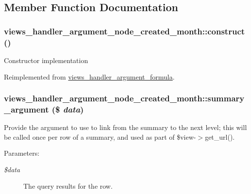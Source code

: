 \subsection{Member Function Documentation}
\hypertarget{classviews__handler__argument__node__created__month_0f9b4da1f37a58ca3e416667dc8d9bbb}{
\subsubsection[{construct}]{\setlength{\rightskip}{0pt plus 5cm}views\_\-handler\_\-argument\_\-node\_\-created\_\-month::construct ()}}
\label{classviews__handler__argument__node__created__month_0f9b4da1f37a58ca3e416667dc8d9bbb}


Constructor implementation 

Reimplemented from \hyperlink{classviews__handler__argument__formula_01284402427de2bcfa1b1da5792a2332}{views\_\-handler\_\-argument\_\-formula}.\hypertarget{classviews__handler__argument__node__created__month_4ecc9b35ee8ae4e8d61d18e83f1dfe82}{
\subsubsection[{summary\_\-argument}]{\setlength{\rightskip}{0pt plus 5cm}views\_\-handler\_\-argument\_\-node\_\-created\_\-month::summary\_\-argument (\$ {\em data})}}
\label{classviews__handler__argument__node__created__month_4ecc9b35ee8ae4e8d61d18e83f1dfe82}


Provide the argument to use to link from the summary to the next level; this will be called once per row of a summary, and used as part of \$view-$>$get\_\-url().

\begin{Desc}
\item[Parameters:]
\begin{description}
\item[{\em \$data}]The query results for the row. \end{description}
\end{Desc}


